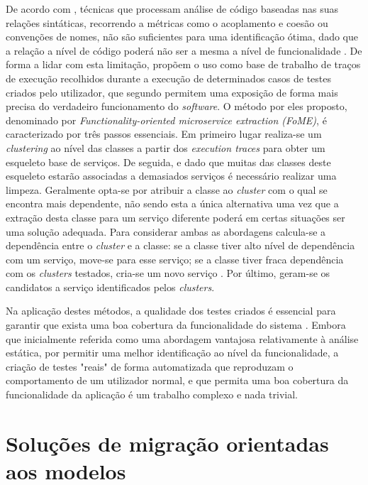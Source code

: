     De acordo com \cite{is_cohesion_and_coupling_enough_candela16}, técnicas que processam análise de código baseadas nas suas relações sintáticas, recorrendo a métricas como o acoplamento e coesão ou convenções de nomes, não são suficientes para uma identificação ótima, dado que a relação a nível de código poderá não ser a mesma a nível de funcionalidade \citep{fome_jin_18}. De forma a lidar com esta limitação, \cite{fome_jin_18} propõem o uso como base de trabalho de traços de execução recolhidos durante a execução de determinados casos de testes criados pelo utilizador, que segundo \cite{execution_traces_expose_behaviour_dit13} permitem uma exposição de forma mais precisa do verdadeiro funcionamento do \textit{software}. O método por eles proposto, denominado por \textit{Functionality-oriented microservice extraction (FoME)}, é caracterizado por três passos essenciais. Em primeiro lugar realiza-se um \textit{clustering} ao nível das classes a partir dos \textit{execution traces} para obter um esqueleto base de serviços. 
    De seguida, e dado que muitas das classes deste esqueleto estarão associadas a demasiados serviços é necessário realizar uma limpeza. Geralmente opta-se por atribuir a classe ao \textit{cluster} com o qual se encontra mais dependente, não sendo esta a única alternativa uma vez que a extração desta classe para um serviço diferente poderá em certas situações ser uma solução adequada. Para considerar ambas as abordagens calcula-se a dependência entre o \textit{cluster} e a classe: se a classe tiver alto nível de dependência com um serviço, move-se para esse serviço; se a classe tiver fraca dependência com os \textit{clusters} testados, cria-se um novo serviço \citep{fome_jin_18}. Por último, geram-se os candidatos a serviço identificados pelos \textit{clusters}.
    
    Na aplicação destes métodos, a qualidade dos testes criados é essencial para garantir que exista uma boa cobertura da funcionalidade do sistema \citep{fome_jin_18}. Embora que inicialmente referida como uma abordagem vantajosa relativamente à análise estática, por permitir uma melhor identificação ao nível da funcionalidade, a criação de testes "reais" de forma automatizada que reproduzam o comportamento de um utilizador normal, e que permita uma boa cobertura da funcionalidade da aplicação é um trabalho complexo e nada trivial.


\section{Soluções de migração orientadas aos modelos}

